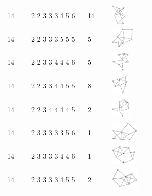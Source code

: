 \begin{table}[h!]
\begin{tabular}{m{0.15\linewidth} m{0.35\linewidth} m{0.15\linewidth} m{0.25\linewidth}}
14 & 2 2 3 3 3 4 5 6 & 14 & \includegraphics[height=1cm]{15-universal-graphs/img/degree-sequences-example-graphs/graph-4-8-87}\\
14 & 2 2 3 3 3 5 5 5 & 5 & \includegraphics[height=1cm]{15-universal-graphs/img/degree-sequences-example-graphs/graph-4-8-88}\\
14 & 2 2 3 3 4 4 4 6 & 5 & \includegraphics[height=1cm]{15-universal-graphs/img/degree-sequences-example-graphs/graph-4-8-89}\\
14 & 2 2 3 3 4 4 5 5 & 8 & \includegraphics[height=1cm]{15-universal-graphs/img/degree-sequences-example-graphs/graph-4-8-90}\\
14 & 2 2 3 4 4 4 4 5 & 2 & \includegraphics[height=1cm]{15-universal-graphs/img/degree-sequences-example-graphs/graph-4-8-91}\\
14 & 2 3 3 3 3 3 5 6 & 1 & \includegraphics[height=1cm]{15-universal-graphs/img/degree-sequences-example-graphs/graph-4-8-92}\\
14 & 2 3 3 3 3 4 4 6 & 1 & \includegraphics[height=1cm]{15-universal-graphs/img/degree-sequences-example-graphs/graph-4-8-93}\\
14 & 2 3 3 3 3 4 5 5 & 2 & \includegraphics[height=1cm]{15-universal-graphs/img/degree-sequences-example-graphs/graph-4-8-94}\\

\end{tabular}
\end{table}
